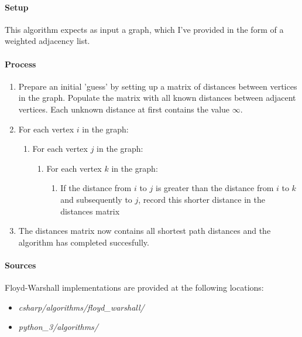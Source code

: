 \documentclass{article}
\begin{document}
\paragraph{Setup}
This algorithm expects as input a graph, which I've provided in the form of a weighted adjacency list.

\paragraph{Process}
\begin{enumerate}
\item{Prepare an initial 'guess' by setting up a matrix of distances between vertices in the graph. Populate the matrix with all
    known distances between adjacent vertices. Each unknown distance at first contains the value \(\infty\).}
\item{For each vertex \(i\) in the graph:}
  \begin{enumerate}
  \item{For each vertex \(j\) in the graph:}
    \begin{enumerate}
    \item{For each vertex \(k\) in the graph:}
      \begin{enumerate}
      \item{If the distance from \(i\) to \(j\) is greater than the distance from \(i\) to \(k\) and subsequently to \(j\),
          record this shorter distance in the distances matrix}
      \end{enumerate}
    \end{enumerate}    
  \end{enumerate}
\item{The distances matrix now contains all shortest path distances and the algorithm has completed succesfully.}
\end{enumerate}

\begin{samepage}
  \paragraph{Sources}
  Floyd-Warshall implementations are provided at the following locations:
  \begin{itemize}
  \item{{\em csharp/algorithms/floyd\_warshall/}}
  \item{{\em python\_3/algorithms/}}
  \end{itemize}
\end{samepage}
\end{document}
